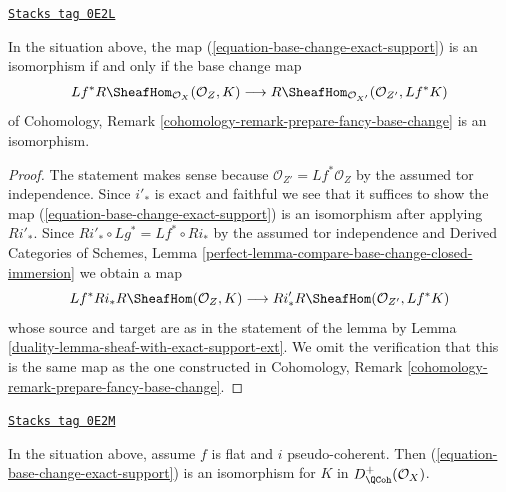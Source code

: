 \begin{lemma}
\label{duality-lemma-check-base-change-is-iso}
\href{https://stacks.math.columbia.edu/tag/0E2L}{\texttt{Stacks tag 0E2L}}

In the situation above, the map (\ref{equation-base-change-exact-support})
is an isomorphism if and only if the base change map
$$
Lf^*R\SheafHom_{\mathcal{O}_X}(\mathcal{O}_Z, K)
\longrightarrow
R\SheafHom_{\mathcal{O}_{X'}}(\mathcal{O}_{Z'}, Lf^*K)
$$
of Cohomology, Remark \ref{cohomology-remark-prepare-fancy-base-change}
is an isomorphism.
\end{lemma}

\begin{proof}

The statement makes sense because $\mathcal{O}_{Z'} = Lf^*\mathcal{O}_Z$
by the assumed tor independence.
Since $i'_*$ is exact and faithful we see that it suffices to show
the map (\ref{equation-base-change-exact-support})
is an isomorphism after applying $Ri'_*$. Since
$Ri'_* \circ Lg^* = Lf^* \circ Ri_*$ by the assumed tor independence and
Derived Categories of Schemes, Lemma
\ref{perfect-lemma-compare-base-change-closed-immersion}
we obtain a map
$$
Lf^*Ri_*R\SheafHom(\mathcal{O}_Z, K)
\longrightarrow
Ri'_*R\SheafHom(\mathcal{O}_{Z'}, Lf^*K)
$$
whose source and target are as in the statement of the lemma by
Lemma \ref{duality-lemma-sheaf-with-exact-support-ext}. We omit the
verification that this is the same map as the one constructed
in Cohomology, Remark \ref{cohomology-remark-prepare-fancy-base-change}.
\end{proof}

\begin{lemma}
\label{duality-lemma-flat-bc-sheaf-with-exact-support}
\href{https://stacks.math.columbia.edu/tag/0E2M}{\texttt{Stacks tag 0E2M}}

In the situation above, assume $f$ is flat and $i$ pseudo-coherent.
Then (\ref{equation-base-change-exact-support}) is an isomorphism
for $K$ in $D^+_\QCoh(\mathcal{O}_X)$.
\end{lemma}

